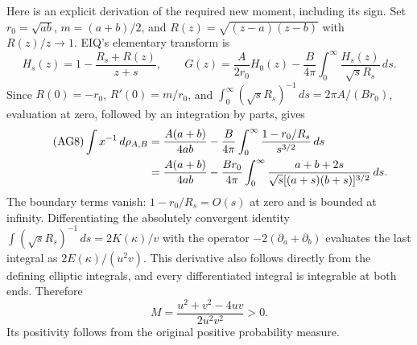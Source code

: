 \documentclass[11pt,a4paper]{article}
\providecommand{\dd}{\,d}
\begin{document}
Here is an explicit derivation of the required new moment, including its sign.
Set $r_0=\sqrt{ab}$, $m=(a+b)/2$, and
$R(z)=\sqrt{(z-a)(z-b)}$ with $R(z)/z\to1$. EIQ's elementary transform is
\[
 H_s(z)=1-\frac{R_s+R(z)}{z+s},\qquad
 G(z)=\frac{A}{2r_0}H_0(z)-\frac B{4\pi}
       \int_0^\infty\frac{H_s(z)}{\sqrt s R_s}\dd s.
\]
Since $R(0)=-r_0$, $R'(0)=m/r_0$, and
$\int_0^\infty (\sqrt sR_s)^{-1}\dd s=2\pi A/(Br_0)$,
evaluation at zero, followed by an integration by parts, gives
\begin{align}\tag{AG8}
 \int x^{-1}\dd\rho_{A,B}
 &=\frac{A(a+b)}{4ab}
   -\frac B{4\pi}\int_0^\infty
           \frac{1-r_0/R_s}{s^{3/2}}\dd s\\
 &=\frac{A(a+b)}{4ab}
   -\frac{Br_0}{4\pi}\int_0^\infty
         \frac{a+b+2s}{\sqrt s[(a+s)(b+s)]^{3/2}}\dd s.\notag
\end{align}
The boundary terms vanish: $1-r_0/R_s=O(s)$ at zero and is bounded at infinity.
Differentiating the absolutely convergent identity
$\int (\sqrt sR_s)^{-1}\dd s=2K(\kappa)/v$ with the operator
$-2(\partial_a+\partial_b)$ evaluates the last integral as $2E(\kappa)/(u^2v)$.
This derivative also follows directly from the defining elliptic integrals,
and every differentiated integral is integrable at both ends. Therefore
\begin{equation}\tag{AG9}
 M=\frac{u^2+v^2-4uv}{2u^2v^2}>0.
\end{equation}
Its positivity follows from the original positive probability measure.
\end{document}
